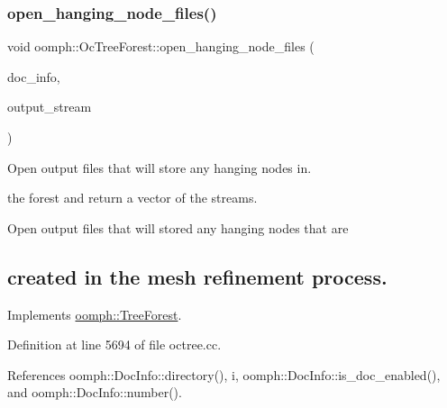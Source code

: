 \mbox{\label{classoomph_1_1OcTreeForest_a6d8d84745819ea3ed42a76d7e1fac3a5}} 
\subsubsection{\texorpdfstring{open\+\_\+hanging\+\_\+node\+\_\+files()}{open\_hanging\_node\_files()}}
{\footnotesize\ttfamily void oomph\+::\+Oc\+Tree\+Forest\+::open\+\_\+hanging\+\_\+node\+\_\+files (\begin{DoxyParamCaption}\item[{\hyperlink{classoomph_1_1DocInfo}{Doc\+Info} \&}]{doc\+\_\+info,  }\item[{\hyperlink{classoomph_1_1Vector}{Vector}$<$ std\+::ofstream $\ast$$>$ \&}]{output\+\_\+stream }\end{DoxyParamCaption})\hspace{0.3cm}{\ttfamily [virtual]}}



Open output files that will store any hanging nodes in. 

the forest and return a vector of the streams.

Open output files that will stored any hanging nodes that are \subsection*{created in the mesh refinement process. }

Implements \hyperlink{classoomph_1_1TreeForest_a384793832d8ab83e23636597e5fe1e1a}{oomph\+::\+Tree\+Forest}.



Definition at line 5694 of file octree.\+cc.



References oomph\+::\+Doc\+Info\+::directory(), i, oomph\+::\+Doc\+Info\+::is\+\_\+doc\+\_\+enabled(), and oomph\+::\+Doc\+Info\+::number().

\mbox{\label{classoomph_1_1OcTreeForest_a20994fe3226a0340a051d846e5c30410}} 
